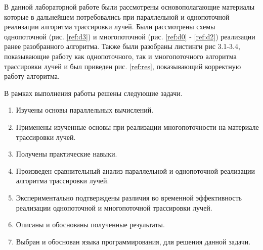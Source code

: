 \Conclusion %

В данной лабораторной работе были рассмотрены
основополагающие материалы которые в дальнейшем потребовались
при параллельной и однопоточной реализации алгоритма трассировки лучей.
Были рассмотрены схемы однопоточной (рис. \ref{ref:d3}) и многопоточной
(рис. \ref{ref:d0} - \ref{ref:d2}) реализации ранее разобранного алгоритма.
Также были разобраны листинги рис 3.1-3.4, показывающие работу как однопоточного, так и многопоточного
алгоритма трассировки лучей и был приведен рис. \ref{ref:res}, показывающий корректную работу алгоритма.

В рамках выполнения работы решены следующие задачи.

\begin{enumerate}
	\item Изучены основы параллельных вычислений.
	\item Применены изученные основы при реализации многопоточности на материале трассировки лучей.
	\item Получены практические навыки.
	\item Произведен сравнительный анализ параллельной и однопоточной реализации алгоритма трассировки лучей.
	\item Экспериментально подтверждены различия во временной эффективность реализации однопоточной и многопоточной трассировки лучей.
	\item Описаны и обоснованы полученные результаты.
	\item Выбран и обоснован языка программирования, для решения данной задачи.
\end{enumerate}
